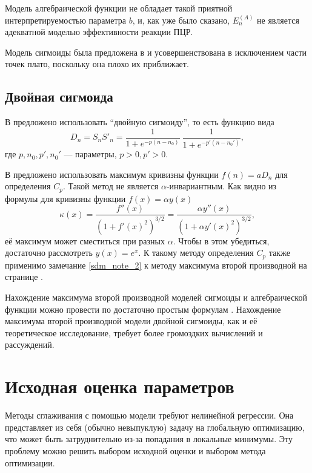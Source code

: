 Модель алгебраической функции не обладает такой приятной интерпретируемостью
параметра $b$, и, как уже было сказано, $E^{(A)}_{n}$ не является адекватной
моделью эффективности реакции ПЦР.

Модель сигмоиды была предложена в \cite{liuValidationQuantitativeMethod2002} и
усовершенствована в \cite{rutledgeSigmoidalCurvefittingRedefines2004}
исключением части точек плато, поскольку она плохо их приближает.

\subsection{Двойная сигмоида}

В
\cite{kurnikPCRElbowDetermination2007,kurnikPCRElbowDetermination2011}
предложено использовать \enquote{двойную сигмоиду}, то есть функцию вида
\[
  D_{n}=S_{n}S'_{n}=\frac{1}{1+e^{-p(n-n_0)}}~
  \frac{1}{1+e^{-p'(n-n_0')}},
\]
где $p,n_0,p',n_0'$ --- параметры, $p>0,p'>0$.

В \cite{kurnikPCRElbowDetermination2011} предложено использовать максимум
кривизны функции $f(n)=aD_{n}$ для определения $C_{p}$. Такой метод не является
$\alpha$\hyp{}инвариантным. Как видно из формулы для кривизны функции
$f(x)=\alpha y(x)$
\[
  \kappa(x)=\frac{f''(x)}{(1+f'(x)^{2})^{3/2}}=
  \frac{\alpha y''(x)}{(1+\alpha y'(x)^{2})^{3/2}},
\]
её максимум может сместиться при разных $\alpha$. Чтобы в этом убедиться,
достаточно рассмотреть $y(x)=e^{x}$. К такому методу определения $C_{p}$ также
применимо замечание \ref{sdm_note_2} к методу максимума второй производной
на странице \pageref{sdm_note_2}.

Нахождение максимума второй производной моделей сигмоиды и алгебраической
функции можно провести по достаточно простым формулам
\cite{zhaoComprehensiveAlgorithmQuantitative2005}. Нахождение максимума второй
производной модели двойной сигмоиды, как и её теоретическое исследование,
требует более громоздких вычислений и рассуждений.

\section{Исходная оценка параметров}\label{sec:initial}

Методы сглаживания с помощью модели требуют нелинейной регрессии. Она
представляет из себя (обычно невыпуклую) задачу на глобальную оптимизацию, что
может быть затруднительно из-за попадания в локальные минимумы. Эту проблему
можно решить выбором исходной оценки и выбором метода оптимизации.

